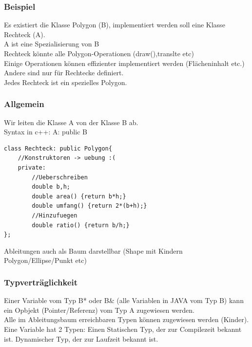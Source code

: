 \documentclass[a4paper]{article}
\begin{document}
\subsubsection*{Beispiel}
Es existiert die Klasse Polygon (B), implementiert werden soll eine Klasse Rechteck (A).\\
A ist eine Spezialisierung von B\\
Rechteck könnte alle Polygon-Operationen (draw(),translte etc)\\
Einige Operationen können effizienter implementiert werden (Flächeninhalt etc.)\\
Andere sind nur für Rechtecke definiert.\\
Jedes Rechteck ist ein spezielles Polygon.
\subsubsection*{Allgemein}
Wir leiten die Klasse A von der Klasse B ab.\\
Syntax in c++: A: public B\\
\begin{lstlisting}
class Rechteck: public Polygon{
	//Konstruktoren -> uebung :(
	private:
		//Ueberschreiben
		double b,h;
		double area() {return b*h;}
		double umfang() {return 2*(b+h);}
		//Hinzufuegen
		double ratio() {return b/h;}
};
\end{lstlisting}
Ableitungen auch als Baum darstellbar (Shape mit Kindern Polygon/Ellipse/Punkt etc)\\
\subsubsection*{Typverträglichkeit}
Einer Variable vom Typ B* oder B\& (alle Variablen in JAVA vom Typ B) kann ein Opbjekt (Pointer/Referenz) vom Typ A zugewiesen werden.\\
Alle im Ableitungsbaum erreichbaren Typen können zugewiesen werden (Kinder).\\
Eine Variable hat 2 Typen: Einen Statischen Typ, der zur Compilezeit bekannt ist. Dynamischer Typ, der zur Laufzeit bekannt ist.
\end{document}
